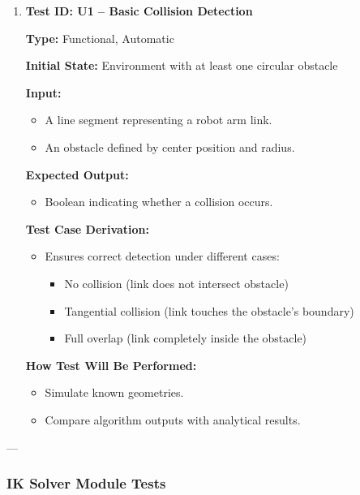 \documentclass[12pt, titlepage]{article}
\begin{document}
\begin{enumerate}
\item \textbf{Test ID: U1 -- Basic Collision Detection}  

\textbf{Type:} Functional, Automatic  

\textbf{Initial State:} Environment with at least one circular obstacle  

\textbf{Input:}  
\begin{itemize}
    \item A line segment representing a robot arm link.
    \item An obstacle defined by center position and radius.
\end{itemize}

\textbf{Expected Output:}  
\begin{itemize}
    \item Boolean indicating whether a collision occurs.
\end{itemize}

\textbf{Test Case Derivation:}  
\begin{itemize}
    \item Ensures correct detection under different cases:
    \begin{itemize}
        \item No collision (link does not intersect obstacle)
        \item Tangential collision (link touches the obstacle's boundary)
        \item Full overlap (link completely inside the obstacle)
    \end{itemize}
\end{itemize}

\textbf{How Test Will Be Performed:}  
\begin{itemize}
    \item Simulate known geometries.
    \item Compare algorithm outputs with analytical results.
\end{itemize}

\end{enumerate}

---

\subsubsection{IK Solver Module Tests}
\end{document}
